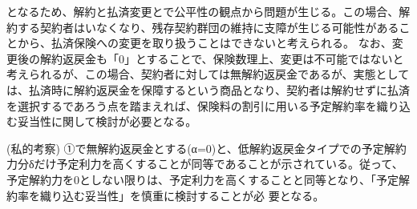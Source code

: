 \documentclass[report,gutter=10mm,fore-edge=10mm,uplatex,dvipdfmx]{jlreq}
\begin{document}
となるため、解約と払済変更とで公平性の観点から問題が生じる。この場合、解約する契約者はいなくなり、残存契約群団の維持に支障が生じる可能性があることから、払済保険への変更を取り扱うことはできないと考えられる。
なお、変更後の解約返戻金も「0」とすることで、保険数理上、変更は不可能ではないと考えられるが、この場合、契約者に対しては無解約返戻金であるが、実態としては、払済時に解約返戻金を保障するという商品となり、契約者は解約せずに払済を選択するであろう点を踏まえれば、保険料の割引に用いる予定解約率を織り込む妥当性に関して検討が必要となる。

(私的考察)
①で無解約返戻金とする(α=0)と、低解約返戻金タイプでの予定解約力分δだけ予定利力を高くすることが同等であることが示されている。従って、予定解約力を0としない限りは、予定利力を高くすることと同等となり、「予定解約率を織り込む妥当性」を慎重に検討することが必
要となる。
\end{document}

